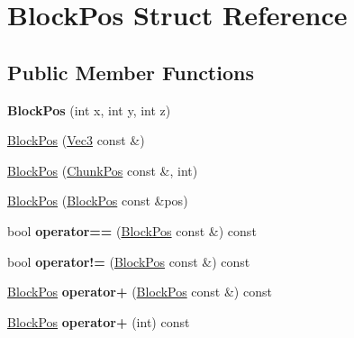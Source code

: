 \hypertarget{struct_block_pos}{}\section{Block\+Pos Struct Reference}
\label{struct_block_pos}
\subsection*{Public Member Functions}
\begin{DoxyCompactItemize}
\item 
\mbox{\label{struct_block_pos_a50643ad3f67ad932798cfc528341f337}} 
{\bfseries Block\+Pos} (int x, int y, int z)
\item 
\mbox{\hyperlink{struct_block_pos_a5c5ac9cc1e63d3ec8514b1cb82d6ff21}{Block\+Pos}} (\mbox{\hyperlink{struct_vec3}{Vec3}} const \&)
\item 
\mbox{\hyperlink{struct_block_pos_a91b87da862d24ecb05ac2d9384037059}{Block\+Pos}} (\mbox{\hyperlink{struct_chunk_pos}{Chunk\+Pos}} const \&, int)
\item 
\mbox{\hyperlink{struct_block_pos_a30b79b2378deb9777057d0290cc414c2}{Block\+Pos}} (\mbox{\hyperlink{struct_block_pos}{Block\+Pos}} const \&pos)
\item 
\mbox{\label{struct_block_pos_a21fb3011684c59daee35ec3e60da351c}} 
bool {\bfseries operator==} (\mbox{\hyperlink{struct_block_pos}{Block\+Pos}} const \&) const
\item 
\mbox{\label{struct_block_pos_a2f9a958f7e29e3804050799306f13ff3}} 
bool {\bfseries operator!=} (\mbox{\hyperlink{struct_block_pos}{Block\+Pos}} const \&) const
\item 
\mbox{\label{struct_block_pos_a478e458fa3ecd933d29bd8d6b4521b70}} 
\mbox{\hyperlink{struct_block_pos}{Block\+Pos}} {\bfseries operator+} (\mbox{\hyperlink{struct_block_pos}{Block\+Pos}} const \&) const
\item 
\mbox{\label{struct_block_pos_a1f4c25db93582519262935844d7bbea8}} 
\mbox{\hyperlink{struct_block_pos}{Block\+Pos}} {\bfseries operator+} (int) const
\item 
\mbox{\label{struct_block_pos_ab6ca1b8b380a076fa8a190868818eed1}} 

\end{DoxyCompactItemize}
